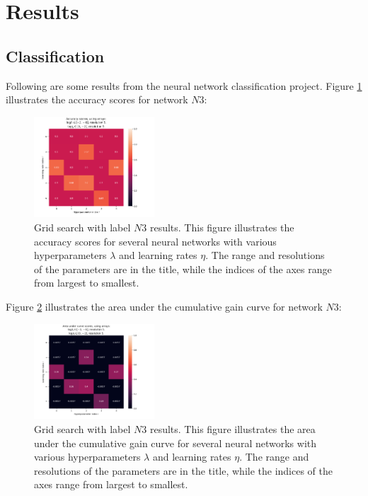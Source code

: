 \section{Results}
    \subsection{Classification}
        
        Following are some results from the neural network classification project. Figure \ref{fig:ANNREG1} illustrates the accuracy scores for network $N3$:
        \begin{figure}
            \centering
            \includegraphics[width=0.4\textwidth]{figures/Ngrid3_acc.png}
            \caption{Grid search with label $N3$ results. This figure illustrates the accuracy scores for several neural networks with various hyperparameters $\lambda$ and learning rates $\eta$. The range and resolutions of the parameters are in the title, while the indices of the axes range from largest to smallest.}
            \label{fig:ANNREG1}
        \end{figure}
        Figure \ref{fig:ANNREG2} illustrates the area under the cumulative gain curve for network $N3$:
        \begin{figure}
            \centering
            \includegraphics[width=0.4\textwidth]{figures/Ngrid3_auc.png}
            \caption{Grid search with label $N3$ results. This figure illustrates the area under the cumulative gain curve for several neural networks with various hyperparameters $\lambda$ and learning rates $\eta$. The range and resolutions of the parameters are in the title, while the indices of the axes range from largest to smallest.}
            \label{fig:ANNREG2}
        \end{figure}
